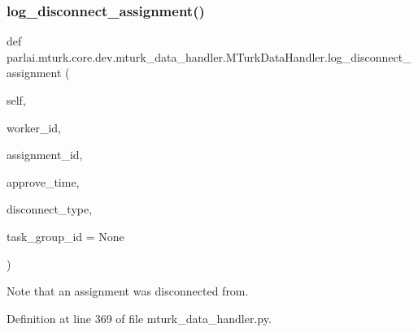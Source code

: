 \subsubsection{\texorpdfstring{log\+\_\+disconnect\+\_\+assignment()}{log\_disconnect\_assignment()}}
{\footnotesize\ttfamily def parlai.\+mturk.\+core.\+dev.\+mturk\+\_\+data\+\_\+handler.\+M\+Turk\+Data\+Handler.\+log\+\_\+disconnect\+\_\+assignment (\begin{DoxyParamCaption}\item[{}]{self,  }\item[{}]{worker\+\_\+id,  }\item[{}]{assignment\+\_\+id,  }\item[{}]{approve\+\_\+time,  }\item[{}]{disconnect\+\_\+type,  }\item[{}]{task\+\_\+group\+\_\+id = {\ttfamily None} }\end{DoxyParamCaption})}

\begin{DoxyVerb}Note that an assignment was disconnected from.
\end{DoxyVerb}
 

Definition at line 369 of file mturk\+\_\+data\+\_\+handler.\+py.


